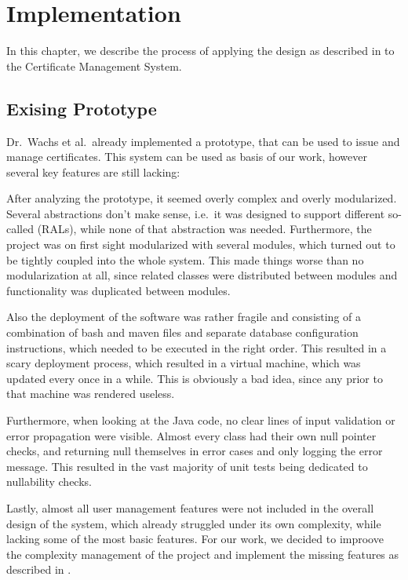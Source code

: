 \chapter{Implementation}\label{ch:implementation}
In this chapter, we describe the process of applying the design as described in  to the
Certificate Management System.

\section{Exising Prototype}\label{sec:exisingPrototype}
Dr.\ Wachs et al.\ already implemented a prototype, that can be used to issue and manage certificates.
This system can be used as basis of our work, however several key features are still lacking:

After analyzing the prototype, it seemed overly complex and overly modularized.
Several abstractions don't make sense, i.e.\ it was designed to support different so-called  (RALs), while none of that abstraction was needed.
Furthermore, the project was on first sight modularized with several  modules, which turned out to be tightly
coupled into the whole system.
This made things worse than no modularization at all, since related classes were distributed between modules and
functionality was duplicated between modules.

Also the deployment of the software was rather fragile and consisting of a combination of bash and maven files and
separate database configuration instructions, which needed to be executed in the right order.
This resulted in a scary deployment process, which resulted in a virtual machine, which was updated every once in a
while.
This is obviously a bad idea, since any  prior to that machine was rendered useless.

Furthermore, when looking at the Java code, no clear lines of input validation or error propagation were visible.
Almost every class had their own null pointer checks, and returning null themselves in error cases and only logging the
error message.
This resulted in the vast majority of unit tests being dedicated to nullability checks.

Lastly, almost all user management features were not included in the overall design of the system, which already
struggled under its own complexity, while lacking some of the most basic features.
For our work, we decided to improove the complexity management of the project and implement the missing features as
described in .

